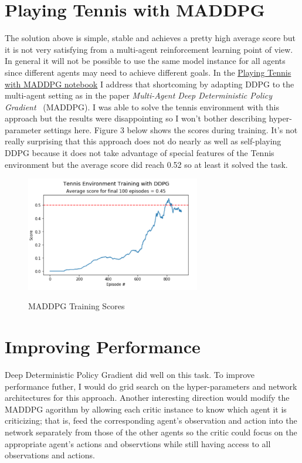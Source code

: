 \documentclass[sigchi]{acmart}
\begin{document}
\section{Playing Tennis with MADDPG}
The solution above is simple, stable and achieves a pretty high average score but it is not very satisfying from a multi-agent reinforcement learning point of view.  In general it will not be possible to use the same model instance for all agents since different agents may need to achieve different goals.
In the 
\href{https://nbviewer.jupyter.org/github/bobflagg/Collaboration-and-Competition/blob/master/02-Playing-Tennis-with-MADDPG.ipynb}{\underline{Playing Tennis with MADDPG notebook}}
 I address that shortcoming by adapting DDPG to the multi-agent setting as in the paper {\em Multi-Agent Deep Deterministic Policy Gradient}~\cite{DBLP:journals/corr/LoweWTHAM17} (MADDPG).   I was able to solve the tennis environment with this approach but the results were disappointing so I won't bother describing hyper-parameter settings here.  Figure 3 below shows the scores during training.  It's not really surprising that this approach does not do nearly as well as self-playing DDPG because it does not take advantage of special features of the Tennis environment but the average score did reach 0.52 so at least it solved the task.
\begin{figure}[h]
	\centering
	\includegraphics[width=3.0in]{ma-scores}
	\label{fig:ddpg-scores}
	\caption{MADDPG Training Scores}
\end{figure}

\section{Improving Performance}

Deep Deterministic Policy Gradient did well on this task.  To improve performance futher, I would do grid search on the hyper-parameters and network architectures for this approach.  Another interesting direction would modify the MADDPG agorithm by allowing each critic instance to know which agent it is criticizing; that is, feed the corresponding agent's observation and action into the network separately from those of the other agents so the critic could focus on the appropriate agent's actions and observtions while still having access to all observations and actions.



\end{document}
